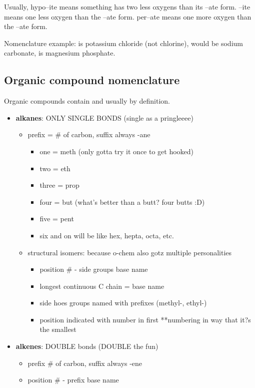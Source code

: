 \documentclass[letterpaper, 12pt]{article}
\begin{document}
	Usually, hypo--ite means something has two less oxygens than its --ate form. --ite means one less oxygen than the --ate form. per--ate means one more oxygen than the --ate form.
	
	Nomenclature example:  is potassium chloride (not chlorine),  would be sodium carbonate,  is magnesium phosphate.
	
	\subsection{Organic compound nomenclature}
	Organic compounds contain  and usually  by definition.
	
	\begin{itemize}
		\item \textbf{alkanes}: ONLY SINGLE BONDS (single as a pringleeee)
		\begin{itemize}
			\item prefix = \# of carbon, suffix always -ane
			\begin{itemize}
				\item one = meth (only gotta try it once to get hooked)
				\item two =  eth
				\item three = prop
				\item four = but (what's better than a butt? four butts :D)
				\item five = pent
				\item six and on will be like hex, hepta, octa, etc.
			\end{itemize}
			\item structural isomers: because o-chem also gotz multiple personalities
			\begin{itemize}
				\item position \# - side groups base name
				\item longest continuous C chain = base name
				\item side hoes groups named with prefixes (methyl-, ethyl-)
				\item position indicated with number in first **numbering in way that it?s the smallest
			\end{itemize}
		\end{itemize}
		\item \textbf{alkenes}: DOUBLE bonds (DOUBLE the fun)
		\begin{itemize}
			\item prefix \# of carbon, suffix always -ene
			\item position \# - prefix base name

\end{itemize}
\end{itemize}
\end{document}
